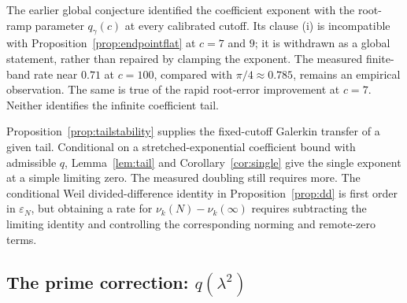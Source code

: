 \documentclass[11pt,a4paper]{article}
\begin{document}
The earlier global conjecture identified the coefficient exponent with the
root-ramp parameter $q_\gamma(c)$ at every calibrated cutoff. Its clause (i)
is incompatible with Proposition~\ref{prop:endpointflat} at $c=7$ and $9$;
it is withdrawn as a global statement, rather than repaired by clamping the
exponent. The measured finite-band rate near $0.71$ at $c=100$, compared with
$\pi/4\approx0.785$, remains an empirical observation. The same is true of
the rapid root-error improvement at $c=7$. Neither identifies the infinite
coefficient tail.

Proposition~\ref{prop:tailstability} supplies the fixed-cutoff Galerkin
transfer of a given tail. Conditional on a stretched-exponential coefficient
bound with admissible $q$, Lemma~\ref{lem:tail} and
Corollary~\ref{cor:single} give the single exponent at a simple limiting
zero. The measured doubling still requires more. The conditional
Weil divided-difference identity in Proposition~\ref{prop:dd} is first order
in $\varepsilon_N$, but obtaining a rate for
$\nu_k(N)-\nu_k(\infty)$ requires subtracting the limiting identity and
controlling the corresponding norming and remote-zero terms.

\subsection{The prime correction: $q(\lambda^2)$}\label{ssec:prime}
\end{document}
